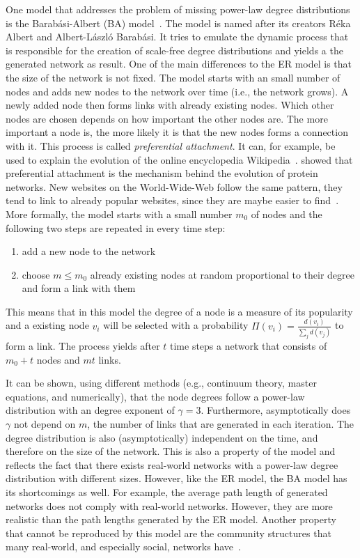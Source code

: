One model that addresses the problem of missing power-law degree distributions is the Barabási-Albert (BA) model~\cite{Barabasi2002}.
The model is named after its creators Réka Albert and Albert-László Barabási.
It tries to emulate the dynamic process that is responsible for the creation of scale-free degree distributions and yields a the generated network as result.
One of the main differences to the ER model is that the size of the network is not fixed.
The model starts with an small number of nodes and adds new nodes to the network over time (i.e., the network grows).
A newly added node then forms links with already existing nodes.
Which other nodes are chosen depends on how important the other nodes are.
The more important a node is, the more likely it is that the new nodes forms a connection with it.
This process is called \emph{preferential attachment}.
It can, for example, be used to explain the evolution of the online encyclopedia Wikipedia~\cite{Caldarelli2006}.
\citet{Eisenberg2003} showed that preferential attachment is the mechanism behind the evolution of protein networks.
New websites on the World-Wide-Web follow the same pattern, they tend to link to already popular websites, since they are maybe easier to find~\cite{Barabasi1999}.
More formally, the model starts with a small number \(m_{0}\) of nodes and the following two steps are repeated in every time step:

\begin{enumerate}
    \item add a new node to the network
    \item choose \(m \leq m_{0}\) already existing nodes at random proportional to their degree and form a link with them
\end{enumerate}

This means that in this model the degree of a node is a measure of its popularity  and a existing node \(v_{i}\) will be selected with a probability \(\Pi(v_{i})=\frac{d(v_{i})}{\sum_{j} d(v_{j})}\) to form a link.
The process yields after \(t\) time steps a network that consists of \(m_{0} + t\) nodes and \(mt\) links.

It can be shown, using different methods (e.g., continuum theory, master equations, and numerically), that the node degrees follow a power-law distribution with an degree exponent of \(\gamma = 3\).
Furthermore, asymptotically does \(\gamma\) not depend on \(m\), the number of links that are generated in each iteration.
The degree distribution is also (asymptotically) independent on the time, and therefore on the size of the network.
This is also a property of the model and reflects the fact that there exists real-world networks with a power-law degree distribution with different sizes.
However, like the ER model, the BA model has its shortcomings as well.
For example, the average path length of generated networks does not comply with real-world networks.
However, they are more realistic than the path lengths generated by the ER model.
Another property that cannot be reproduced by this model are the community structures that many real-world, and especially social, networks have~\cite{Reid2011}.

